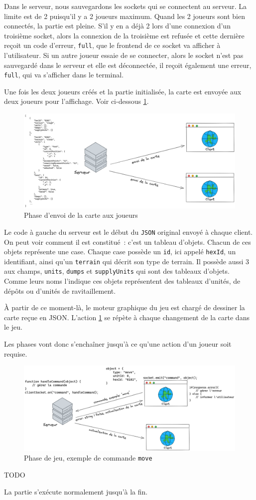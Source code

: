 Dans le serveur, nous sauvegardons les sockets qui se connectent au serveur. La limite est de 2 puisqu'il y a 2 joueurs maximum. Quand les 2 joueurs sont bien connectés, la partie est pleine. S'il y en a déjà 2 lors d'une connexion d'un troisième socket, alors la connexion de la troisième est refusée et cette dernière reçoit un code d'erreur, {\tt full}, que le frontend de ce socket va afficher à l'utilisateur.
Si un autre joueur essaie de se connecter, alors le socket n'est pas sauvegardé dans le serveur et elle est déconnectée, il reçoit également une erreur, {\tt full}, qui va s'afficher dans le terminal.

Une fois les deux joueurs créés et la partie initialisée, la carte est envoyée aux deux joueurs pour l'affichage. Voir ci-dessous \ref{reseau_carte}.

\begin{figure}[H]
    \centering
    \includegraphics[scale=0.25]{data/reseau_map.png}
    \caption{Phase d'envoi de la carte aux joueurs}
    \label{reseau_carte}
\end{figure}

Le code à gauche du serveur est le début du {\tt JSON} original envoyé à chaque client.
On peut voir comment il est constitué : c'est un tableau d'objets. Chacun de ces objets représente une case.
Chaque case possède un {\tt id}, ici appelé {\tt hexId}, un identifiant, ainsi qu'un {\tt terrain} qui décrit son type de terrain.
Il possède aussi 3 aux champs, {\tt units}, {\tt dumps} et {\tt supplyUnits} qui sont des tableaux d'objets.
Comme leurs noms l'indique ces objets représentent des tableaux d'unités, de dépôts ou d'unités de ravitaillement.

À partir de ce moment-là, le moteur graphique du jeu est chargé de dessiner la carte reçue en JSON.
L'action \ref{reseau_carte} se répète à chaque changement de la carte dans le jeu.


Les phases vont donc s'enchaîner jusqu'à ce qu'une action d'un joueur soit requise.

\begin{figure}[H]
    \centering
    \includegraphics[scale=0.25]{data/reseau_commande.png}
    \caption{Phase de jeu, exemple de commande {\tt move}}
\end{figure}

TODO

La partie s'exécute normalement jusqu'à la fin.